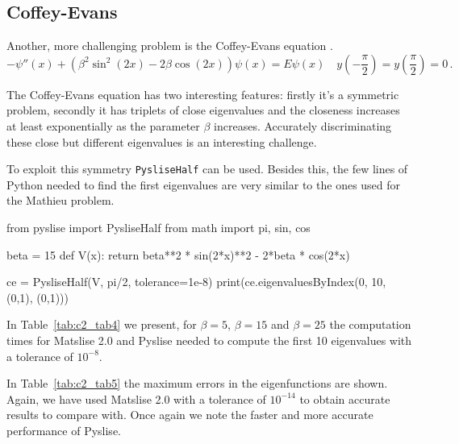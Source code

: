 \subsection{Coffey-Evans}\label{coffey-evans}


Another, more challenging problem is the Coffey-Evans equation \cite{pryce_error_1986}.
\begin{equation}
  -\psi''(x) + (\beta^2\sin^2(2x)-2\beta\cos(2x))\psi(x) = E\psi(x) \quad y(-\frac{\pi}{2})=y(\frac{\pi}{2})=0 \,. \label{ce}
\end{equation}

The Coffey-Evans equation has two interesting features: firstly it's a symmetric problem, secondly it has triplets of close eigenvalues and the closeness increases at least exponentially as the parameter $\beta$ increases. Accurately discriminating these close but different eigenvalues is an interesting challenge.

To exploit this symmetry \texttt{PysliseHalf} can be used. Besides this, the few lines of Python needed to find the first eigenvalues are very similar to the ones used for the Mathieu problem.

\begin{python}
from pyslise import PysliseHalf
from math import pi, sin, cos

beta = 15
def V(x):
    return beta**2 * sin(2*x)**2 - 2*beta * cos(2*x)

ce = PysliseHalf(V, pi/2, tolerance=1e-8)
print(ce.eigenvaluesByIndex(0, 10, (0,1), (0,1)))
\end{python}

In Table~\ref{tab:c2_tab4} we present, for $\beta=5$, $\beta=15$ and $\beta=25$ the computation times for Matslise 2.0 and Pyslise needed to compute the first 10 eigenvalues with a tolerance of $10^{-8}$.



In Table~\ref{tab:c2_tab5} the maximum errors in the eigenfunctions are shown. Again, we have used Matslise 2.0 with a tolerance of $10^{-14}$ to obtain accurate results to compare with.
Once again we note the faster and more accurate performance of Pyslise.

